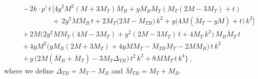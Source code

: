 \documentclass[preprintnumbers,prd,superscriptaddress,preprint]{revtex4-1}
\newcommand{\MBbar}{\overline{M}_{\!B}}
\newcommand{\MTbar}{\overline{M}_T}
\newcommand{\MTBbar}{\overline{M}_{TB}}
\begin{document}
\begin{subequations}
\begin{eqnarray}
&&
-\, 2 k\cdot p'\, t\, 
\Big[ 4 y^2 M^2 (M+3M_T) \MBbar
    + y \MBbar \MTbar (M_T (2M-3M_T) + t)
\nonumber\\
&& \qquad\qquad
+\, 2 y^2 M \MBbar\, t
    + 2 \MTbar \big( 2 M - \overline{M}_{TB} \big)\, k^2
    + y \big( 4 M (\MTbar-yM) + t \big)\, k^2 
\Big]
\nonumber\\
&&
+\, 2M \big( 2 y^2 M M_T (4M-3M_T) + y^2 (2M-3M_T)\, t + 4 M_T\, k^2 \big)\,
    \MBbar \MTbar\, t
\nonumber\\
&&
+\, 4 y M^2 
    \big( y M_B (2M+3M_T) + 4 y M M_T - \MTBbar M_T - 2 M M_B    
    \big)\, t\, k^2
\nonumber\\
&&
+\, y\, \big( 2M (\MBbar+\MTbar) - 3M_T \Delta_{TB} \big)\, t^2\, k^2
    + 8 M M_T\, t\, k^4
\bigg\}\, ,
\end{eqnarray}
\end{subequations}
%
where we define $\Delta_{TB}=M_T-M_B$ and $\overline{M}_{TB}=M_T+M_B$.
\end{document}
